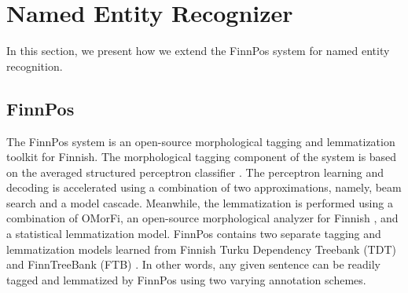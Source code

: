 \documentclass[11pt]{article}
\begin{document}






\section{Named Entity Recognizer}
\label{sec: named entity recognizer}

In this section, we present how we extend the FinnPos system \citep{silfverberg2015} for named entity recognition.


\subsection{FinnPos}

The FinnPos system \citep{silfverberg2015} is an open-source morphological tagging and lemmatization toolkit for Finnish. The morphological tagging component of the system is based on the averaged structured perceptron classifier \citep{collins2002}. The perceptron learning and decoding is accelerated using a combination of two approximations, namely, beam search and a model cascade. Meanwhile, the lemmatization is performed using a combination of OMorFi, an open-source morphological analyzer for Finnish \citep{pirinen2008}, and a statistical lemmatization model. FinnPos contains two separate tagging and lemmatization models learned from Finnish Turku Dependency Treebank (TDT) \citep{} and FinnTreeBank (FTB) \citep{}. In other words, any given sentence can be readily tagged and lemmatized by FinnPos using two varying annotation schemes. 
\end{document}

